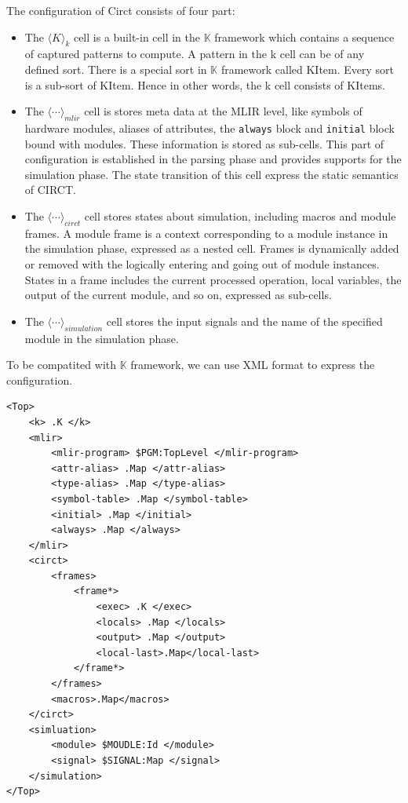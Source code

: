 The configuration of Circt consists of four part:
\begin{itemize}
    \item The $\langle K\rangle_k$ cell is a built-in cell in the $\mathbb{K}$ framework which contains a sequence of captured patterns to compute. A pattern in the k cell can be of any defined sort. There is a special sort in $\mathbb{K}$ framework called KItem. Every sort is a sub-sort of KItem. Hence in other words, the k cell consists of KItems.
    
    \item The $\langle \cdots\rangle_{mlir}$ cell is stores meta data at the MLIR level, like symbols of hardware modules, aliases of attributes, the \verb|always| block and \verb|initial| block bound with modules. These information is stored as sub-cells. This part of configuration is established in the parsing phase and provides supports for the simulation phase. The state transition of this cell express the static semantics of CIRCT.
    
    \item The $\langle \cdots\rangle_{circt}$ cell stores states about simulation, including macros and module frames. A module frame is a context corresponding to a module instance in the simulation phase, expressed as a nested cell. Frames is dynamically added or removed with the logically entering and going out of module instances. States in a frame includes the current processed operation, local variables, the output of the current module, and so on, expressed as sub-cells.

    \item The $\langle \cdots\rangle_{simulation}$ cell stores the input signals and the name of the specified module in the simulation phase.
\end{itemize}
To be compatited with $\mathbb{K}$ framework, we can use XML format to express the configuration.
\begin{lstlisting}
<Top>
    <k> .K </k>
    <mlir>
        <mlir-program> $PGM:TopLevel </mlir-program>
        <attr-alias> .Map </attr-alias>
        <type-alias> .Map </type-alias> 
        <symbol-table> .Map </symbol-table>
        <initial> .Map </initial>
        <always> .Map </always>
    </mlir>
    <circt>
        <frames>
            <frame*>
                <exec> .K </exec>
                <locals> .Map </locals>
                <output> .Map </output>
                <local-last>.Map</local-last>
            </frame*>
        </frames>
        <macros>.Map</macros>
    </circt>
    <simluation>
        <module> $MOUDLE:Id </module>
        <signal> $SIGNAL:Map </signal>
    </simulation>
</Top>
\end{lstlisting}


